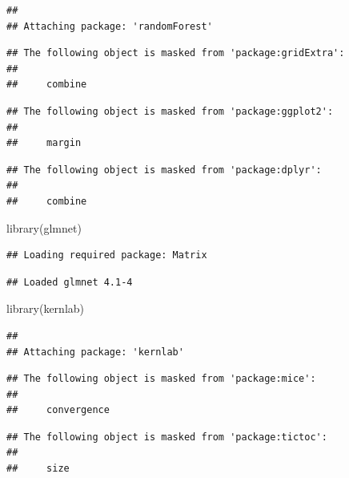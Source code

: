 \documentclass[
]{article}
\newenvironment{Shaded}{\begin{snugshade}}{\end{snugshade}}
\newcommand{\FunctionTok}[1]{\textcolor[rgb]{0.00,0.00,0.00}{#1}}
\newcommand{\NormalTok}[1]{#1}
\newcommand{\StringTok}[1]{\textcolor[rgb]{0.31,0.60,0.02}{#1}}
\begin{document}
\begin{verbatim}
## 
## Attaching package: 'randomForest'
\end{verbatim}

\begin{verbatim}
## The following object is masked from 'package:gridExtra':
## 
##     combine
\end{verbatim}

\begin{verbatim}
## The following object is masked from 'package:ggplot2':
## 
##     margin
\end{verbatim}

\begin{verbatim}
## The following object is masked from 'package:dplyr':
## 
##     combine
\end{verbatim}

\begin{Shaded}
\begin{Highlighting}[]
\FunctionTok{library}\NormalTok{(}\StringTok{\textquotesingle{}glmnet\textquotesingle{}}\NormalTok{)}
\end{Highlighting}
\end{Shaded}

\begin{verbatim}
## Loading required package: Matrix
\end{verbatim}

\begin{verbatim}
## Loaded glmnet 4.1-4
\end{verbatim}

\begin{Shaded}
\begin{Highlighting}[]
\FunctionTok{library}\NormalTok{(}\StringTok{\textquotesingle{}kernlab\textquotesingle{}}\NormalTok{)}
\end{Highlighting}
\end{Shaded}

\begin{verbatim}
## 
## Attaching package: 'kernlab'
\end{verbatim}

\begin{verbatim}
## The following object is masked from 'package:mice':
## 
##     convergence
\end{verbatim}

\begin{verbatim}
## The following object is masked from 'package:tictoc':
## 
##     size
\end{verbatim}
\end{document}
